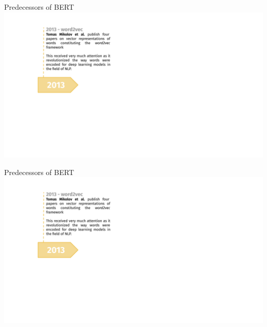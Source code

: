 \documentclass[]{beamer}
\begin{document}
\begin{frame}[noframenumbering]{Predecessors of BERT}
\hbox{\hspace{-4.5em} \includegraphics[width=14cm,page=4]{figure/transfer_learning_timeline1_nlp.pdf}}
\end{frame}
\begin{frame}[noframenumbering]{Predecessors of BERT}
\hbox{\hspace{-4.5em} \includegraphics[width=14cm,page=5]{figure/transfer_learning_timeline1_nlp.pdf}}
\end{frame}
\end{document}
